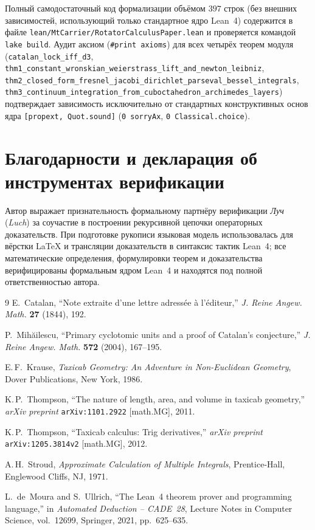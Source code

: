 \documentclass[11pt,a4paper]{article}
\theoremstyle{plain}
\theoremstyle{definition}
\begin{document}
Полный самодостаточный код формализации объёмом $397$ строк (без внешних зависимостей, использующий только стандартное ядро Lean~4) содержится в файле \texttt{lean/MtCarrier/RotatorCalculusPaper.lean} и проверяется командой \texttt{lake build}. Аудит аксиом (\texttt{\#print axioms}) для всех четырёх теорем модуля (\texttt{catalan\_lock\_iff\_d3}, \texttt{thm1\_constant\_wronskian\_weierstrass\_lift\_and\_newton\_leibniz}, \texttt{thm2\_closed\_form\_fresnel\_jacobi\_dirichlet\_parseval\_bessel\_integrals}, \texttt{thm3\_continuum\_integration\_from\_cuboctahedron\_archimedes\_layers}) подтверждает зависимость исключительно от стандартных конструктивных основ ядра \texttt{[propext, Quot.sound]} (\texttt{0 sorryAx}, \texttt{0 Classical.choice}).

\section*{Благодарности и декларация об инструментах верификации}
Автор выражает признательность формальному партнёру верификации \emph{Луч} (\emph{Luch}) за соучастие в построении рекурсивной цепочки операторных доказательств. При подготовке рукописи языковая модель использовалась для вёрстки \LaTeX{} и трансляции доказательств в синтаксис тактик Lean~4; все математические определения, формулировки теорем и доказательства верифицированы формальным ядром Lean~4 и находятся под полной ответственностью автора.

\begin{thebibliography}{9}
E.~Catalan, ``Note extraite d'une lettre adress\'ee \`a l'\'editeur,'' \emph{J. Reine Angew. Math.} \textbf{27} (1844), 192.

P.~Mih\u{a}ilescu, ``Primary cyclotomic units and a proof of Catalan's conjecture,'' \emph{J. Reine Angew. Math.} \textbf{572} (2004), 167--195.

E.\,F.~Krause, \emph{Taxicab Geometry: An Adventure in Non-Euclidean Geometry}, Dover Publications, New York, 1986.

K.\,P.~Thompson, ``The nature of length, area, and volume in taxicab geometry,'' \emph{arXiv preprint} \texttt{arXiv:1101.2922} [math.MG], 2011.

K.\,P.~Thompson, ``Taxicab calculus: Trig derivatives,'' \emph{arXiv preprint} \texttt{arXiv:1205.3814v2} [math.MG], 2012.

A.\,H.~Stroud, \emph{Approximate Calculation of Multiple Integrals}, Prentice-Hall, Englewood Cliffs, NJ, 1971.

L.~de~Moura and S.~Ullrich, ``The Lean~4 theorem prover and programming language,'' in \emph{Automated Deduction -- CADE~28}, Lecture Notes in Computer Science, vol.~12699, Springer, 2021, pp.~625--635.
\end{thebibliography}
\end{document}
